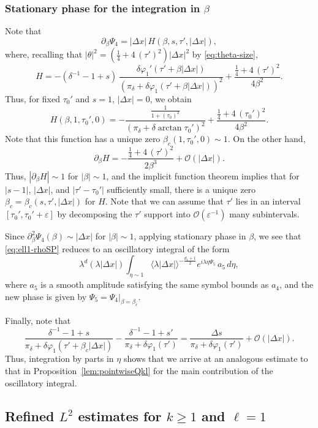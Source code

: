\documentclass[leqno]{amsart}
\theoremstyle{definition}
\theoremstyle{remark}
\numberwithin{equation}{section}
\begin{document}
\subsubsection{Stationary phase for the integration in $\beta$}
Note that
\[
\partial_\beta \Psi_4 = |\Delta x|\, H(\beta,s,\tau', |\Delta x|),
\]
where, recalling that $|\theta|^2=(\frac14+4\,(\tau')^2)|\Delta x |^2$ by \eqref{eq:theta-size},
\[
H = -(\delta^{-1}-1+s)\,
\frac{\delta \varphi_1'(\tau'+\beta|\Delta x|)}
{(\pi_\delta+\delta\varphi_1(\tau'+\beta|\Delta x|))^2}
+\frac{\frac14+4\,(\tau')^2}{4\beta^2}.
\]
Thus, for fixed $\tau_0'$ and $s=1$, $|\Delta x|=0$, we obtain
\[
H(\beta,1,\tau_0',0)
=
-\frac{\frac1{1+(\tau_0)^2}}{(\pi_\delta+\delta \arctan \tau_0')^2}
+\frac{\frac14+4\,(\tau_0')^2}{4\beta^2}.
\]
Note that this function has a unique zero $\beta_c(1,\tau_0',0)\sim 1$. On the other hand,
\[
\partial_\beta H  = -\frac{\frac14+4\,(\tau')^2}{2\beta^3}+\mathcal O(|\Delta x|).
\]
Thus, $|\partial_\beta H| \sim 1$ for $|\beta|\sim 1$, and the implicit function theorem implies that for $|s-1|$, $|\Delta x|$, and $|\tau'-\tau_0'|$ sufficiently small, there is a unique zero $\beta_c=\beta_c(s,\tau',|\Delta x|)$ for $H$. Note that we can assume that $\tau'$ lies in an interval $[\tau_0',\tau_0'+\varepsilon]$ by decomposing the $\tau'$ support into $\mathcal O(\varepsilon^{-1})$ many subintervals.

Since $\partial_\beta^2\Psi_4 (\beta)\sim |\Delta x|$ for $|\beta|\sim 1$, applying stationary phase in $\beta$, we see that \eqref{eq:ell1-rhoSP} reduces to an oscillatory integral of the form
\begin{equation}\label{eq:ell1-betaSP-post}
\lambda^{d}(\lambda|\Delta x|)\int_{\eta\sim 1}
\langle \lambda|\Delta x|\rangle^{-\frac{d_1+1}{2}}
e^{i\lambda\eta \Psi_5}\,
a_5\, d\eta,
\end{equation}
where $a_5$ is a smooth amplitude satisfying the same symbol bounds as $a_4$, and the new phase is given by $\Psi_5=\Psi_4 |_{\beta=\beta_c}$.

Finally, note that
\[
\frac{\delta^{-1}-1+s}{\pi_\delta+\delta\varphi_1(\tau'+\beta_c|\Delta x|)}
-\frac{\delta^{-1}-1+s'}{\pi_\delta+\delta\varphi_1(\tau')}
 = \frac{\Delta s}{\pi_\delta+\delta\varphi_1(\tau')} + \mathcal O(|\Delta x|).
\]
Thus, integration by parts in $\eta$ shows that we arrive at an analogous estimate to that in Proposition~\ref{lem:pointwiseQkl} for the main contribution of the oscillatory integral.


\subsection{Refined $L^2$ estimates for $k\ge 1$ and $\ell=1$}\label{eq:inter-L21}
\end{document}
